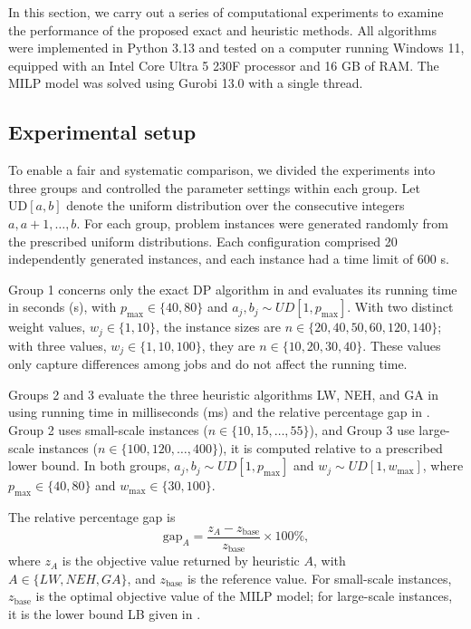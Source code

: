 \documentclass[12pt]{article} \textheight=24.5cm \textwidth=16.5cm \parskip = 0.165cm
\begin{document}
\begin{sloppypar}
        In this section, we carry out a series of computational experiments to examine the performance of the proposed exact and heuristic methods. All algorithms were implemented in Python 3.13 and tested on a computer running Windows 11, equipped with an Intel Core Ultra 5 230F processor and 16 GB of RAM. The MILP model was solved using Gurobi 13.0 with a single thread.
        
        \subsection{Experimental setup} \label{sec:setup}
        
        To enable a fair and systematic comparison, we divided the experiments into three groups and controlled the parameter settings within each group. Let $\mathrm{UD}[a, b]$ denote the uniform distribution over the consecutive integers $a, a+1, \ldots, b$. For each group, problem instances were generated randomly from the prescribed uniform distributions. Each configuration comprised 20 independently generated instances, and each instance had a time limit of 600 s.
        
        Group 1 concerns only the exact DP algorithm in  and evaluates its running time in seconds (s), with $p_{\max} \in \{40, 80\}$ and $a_j, b_j \sim UD[1, p_{\max}]$. With two distinct weight values, $w_j \in \{1,10\}$, the instance sizes are $n \in \{20,40,50,60,120,140\}$; with three values, $w_j \in \{1,10,100\}$, they are $n \in \{10,20,30,40\}$. These values only capture differences among jobs and do not affect the running time. 
        
        Groups 2 and 3 evaluate the three heuristic algorithms LW, NEH, and GA in   using running time in milliseconds (ms) and the relative percentage gap in . Group 2 uses small-scale instances ($n \in \{10,15,\ldots,55\}$), and Group 3 use large-scale instances ($n \in \{100,120,\ldots,400\}$), it is computed relative to a prescribed lower bound. In both groups, $a_j, b_j \sim UD[1, p_{\max}]$ and $w_j \sim UD[1, w_{\max}]$, where $p_{\max} \in \{40, 80\}$ and $w_{\max} \in \{30, 100\}$.
        
        The relative percentage gap is
        \begin{equation}\label{eq:gap}
            \text{gap}_A =
            \frac{z_A-z_{\text{base}}}{z_{\text{base}}}\times 100\%,
        \end{equation}
        where $z_A$ is the objective value returned by heuristic $A$, with $A \in\{LW, NEH, GA\}$, and $z_{\text{base}}$ is the reference value. For small-scale instances, $z_{\text{base}}$ is the optimal objective value of the MILP model; for large-scale instances, it is the lower bound LB given in .
        

\end{sloppypar}
\end{document}
